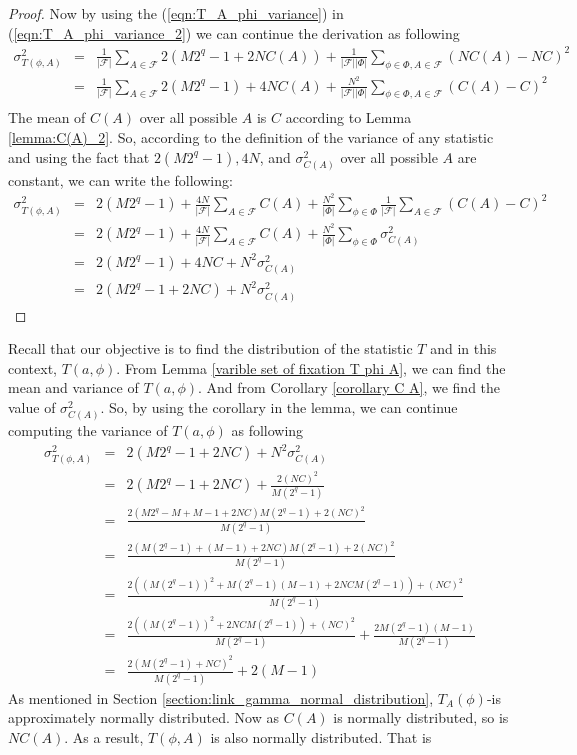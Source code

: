 \begin{proof}
Now by using the (\ref{eqn:T_A_phi_variance}) in (\ref{eqn:T_A_phi_variance_2}) we can continue the derivation as following
\begin{eqnarray*}
\sigma^{2}_{T\left(\phi,A\right)} &=& \frac{1}{|\mathcal{F}|}\displaystyle\sum_{A \in \mathcal{F}}2(M2^q-1+2NC(A)) + \frac{1}{|\mathcal{F}||\Phi|}\displaystyle\sum_{\phi \in \Phi, A \in \mathcal{F}}(NC(A)-NC)^2\\
&=& \frac{1}{|\mathcal{F}|}\displaystyle\sum_{A \in \mathcal{F}}2(M2^q-1)+4NC(A) + \frac{N^2}{|\mathcal{F}||\Phi|}\displaystyle\sum_{\phi \in \Phi, A \in \mathcal{F}}(C(A)-C)^2\\
\end{eqnarray*}
The mean of $C\left(A\right)$ over all possible $A$ is $C$ according to Lemma \ref{lemma:C(A)_2}. So, according to the definition of the variance of any statistic and using the fact that $2\left(M2^q -1 \right),4N$, and $\sigma_{C\left(A\right)}^2$ over all possible $A$  are constant, we can write the following:
\begin{eqnarray*}
\sigma^{2}_{T\left(\phi,A\right)} &=& 2(M2^q-1) + \frac{4N}{|\mathcal{F}|}\displaystyle\sum_{A \in \mathcal{F}} C(A) + \frac{N^2}{|\Phi|}\displaystyle\sum_{\phi \in \Phi}\frac{1}{|\mathcal{F}|}\displaystyle\sum_{A \in \mathcal{F}}(C(A)-C)^2\\
&=& 2(M2^q-1) + \frac{4N}{|\mathcal{F}|}\displaystyle\sum_{A \in \mathcal{F}} C(A) + \frac{N^2}{|\Phi|}\displaystyle\sum_{\phi \in \Phi}\sigma_{C(A)}^{2}\\
&=& 2(M2^q-1)+4NC + N^2\sigma_{C(A)}^{2}\\
&=& 2(M2^q-1+2NC) + N^2\sigma_{C(A)}^{2}
\end{eqnarray*}
\end{proof}Recall that our objective is to find the distribution of the statistic $T$ and in this context, $T\left(a,\phi \right)$. From Lemma \ref{varible set of fixation T phi A}, we can find the mean and variance of $T\left(a,\phi \right)$. And from Corollary \ref{corollary C A}, we find the value of $\sigma_{C(A)}^{2}$. So, by using the corollary in the lemma, we can continue computing the variance of $T\left(a,\phi\right)$ as following
\begin{eqnarray*}
\sigma^{2}_{T\left(\phi,A\right)} &=& 2(M2^q-1+2NC) + N^2\sigma_{C(A)}^{2}\\
&=& 2(M2^q-1+2NC) + \frac{2(NC)^2}{M(2^q-1)}\\
&=& \frac{2(M2^q-M+M-1+2NC)M(2^q-1) + 2(NC)^2}{M(2^q-1)}\\
&=& \frac{2(M(2^q-1)+(M-1)+2NC)M(2^q-1) + 2(NC)^2}{M(2^q-1)}\\
&=&\frac{2((M(2^q-1))^2+M(2^q-1)(M-1)+2NCM(2^q-1))+ (NC)^2}{M(2^q-1)}\\
&=& \frac{2((M(2^q-1))^2+2NCM(2^q-1))+ (NC)^2}{M(2^q-1)}+\frac{2M(2^q-1)(M-1)}{M(2^q-1)}\\
&=& \frac{2(M(2^q-1)+ NC)^2}{M(2^q-1)}+2(M-1)
\end{eqnarray*} As mentioned in Section \ref{section:link_gamma_normal_distribution}, $T_{A}(\phi)$-is approximately normally distributed. Now as $C(A)$ is normally distributed, so is $NC\left(A\right)$. As a result, $T\left(\phi,A\right)$ is also normally distributed. That is
